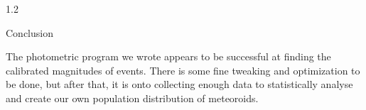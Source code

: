 \documentclass[final]{beamer}
\newlength{\twocolwid}
\begin{document}
\begin{frame}[t]
\begin{columns}[t]
\begin{column}{1.2\twocolwid}


\begin{block}{Conclusion}

The photometric program we wrote appears to be successful at finding the calibrated magnitudes of events. There is some fine tweaking and optimization to be done, but after that, it is onto collecting enough data to statistically analyse and create our own population distribution of meteoroids. 

\end{block}














\end{column}
\end{columns}
\end{frame}
\end{document}
